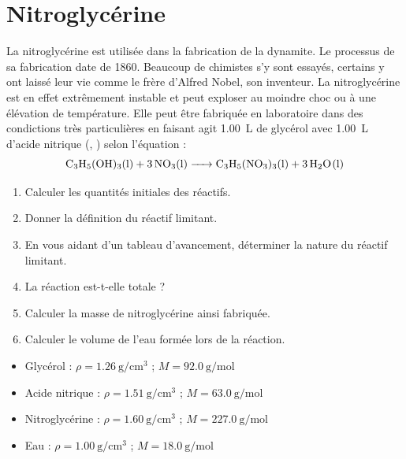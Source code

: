 \documentclass[a4paper,fontsize=14pt,fleqn]{scrartcl}%
\begin{document}
\maketitle

\section{Nitroglycérine}

La nitroglycérine est utilisée dans la fabrication de la dynamite. Le processus de sa fabrication date de 1860. Beaucoup de chimistes s'y sont essayés, certains y ont laissé leur vie comme le frère d'Alfred Nobel, son inventeur. La nitroglycérine est en effet extrêmement instable et peut exploser au moindre choc ou à une élévation de température. Elle peut être fabriquée en laboratoire dans des condictions très particulières en faisant agit \SI{1,00}{L} de glycérol  avec \SI{1,00}{L} d'acide nitrique (, ) selon l'équation : $$ \ce{C3H5(OH)3(l) + 3NO3(l) -> C3H5(NO3)3(l) + 3H2O(l)}$$

\begin{enumerate}
    \item Calculer les quantités initiales des réactifs.
    \item Donner la définition du réactif limitant.
    \item En vous aidant d'un tableau d'avancement, déterminer la nature du réactif limitant.
    \item La réaction est-t-elle totale ?
    \item Calculer la masse de nitroglycérine ainsi fabriquée.
    \item Calculer le volume de l'eau formée lors de la réaction.
\end{enumerate}

\begin{data}
    \begin{itemize}
        \item Glycérol : $\rho = \SI{1,26}{\gram\per\centi\meter\cubed}$ ; $M = \SI{92,0}{\gram\per\mole}$
        \item Acide nitrique : $\rho = \SI{1,51}{\gram\per\centi\meter\cubed}$ ; $M = \SI{63,0}{\gram\per\mole}$
        \item Nitroglycérine : $\rho = \SI{1,60}{\gram\per\centi\meter\cubed}$ ; $M = \SI{227,0}{\gram\per\mole}$
        \item Eau : $\rho = \SI{1,00}{\gram\per\centi\meter\cubed}$ ; $M = \SI{18,0}{\gram\per\mole}$
    \end{itemize}
\end{data}
\end{document}
